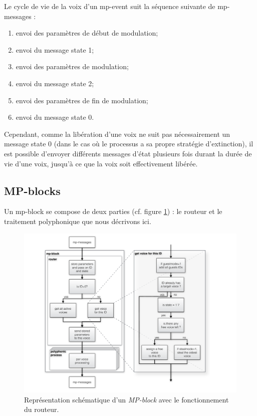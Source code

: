 \noindent Le cycle de vie de la voix d'un mp-event suit la séquence suivante de mp-messages :
\vspace{-1em}
\begin{enumerate}[noitemsep]
	\item envoi des paramètres de début de modulation;
	\item envoi du message state 1;
	\item envoi des paramètres de modulation;
	\item envoi du message state 2;
	\item envoi des paramètres de fin de modulation;
	\item envoi du message state 0.
\end{enumerate}
\noindent Cependant, comme la libération d'une voix ne suit pas nécessairement un message state 0 (dans le cas où le processus a sa propre stratégie d'extinction), il est possible d'envoyer différents messages d'état plusieurs fois durant la durée de vie d'une voix, jusqu'à ce que la voix soit effectivement libérée.

\subsection{MP-blocks}

\noindent Un mp-block se compose de deux parties (cf. figure \ref{fig:algorithms:MP-block-model}) : le routeur et le traitement polyphonique que nous décrivons ici.

\begin{figure}[!htbp]
	\captionsetup{format=plain}
	\includegraphics[width=\textwidth]{gfx/04_algorithms/MP-block-model.pdf}
	\caption[Représentation schématique d'un \textit{MP-block}]{Représentation schématique d'un \textit{MP-block} avec le fonctionnement du routeur.}
	\label{fig:algorithms:MP-block-model}
\end{figure}


